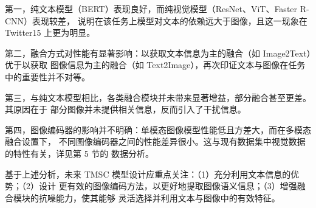 \documentclass[12pt]{ctexart}
\begin{document}
第一，纯文本模型（BERT）表现良好，而纯视觉模型（ResNet、ViT、Faster R-CNN）表现较差，
说明在该任务上模型对文本的依赖远大于图像，且这一现象在 Twitter15 上更为明显。

第二，融合方式对性能有显著影响：以获取文本信息为主的融合（如 Image2Text）优于以获取
图像信息为主的融合（如 Text2Image），再次印证文本与图像在任务中的重要性并不对等。

第三，与纯文本模型相比，各类融合模块并未带来显著增益，部分融合甚至更差。其原因在于
部分图像并未提供相关信息，反而引入了干扰信息。

第四，图像编码器的影响并不明确：单模态图像模型性能低且方差大，而在多模态融合设置下，
不同图像编码器之间的性能差异很小。这与现有数据集中视觉数据的特性有关，详见第 5 节的
数据分析。

基于上述分析，未来 TMSC 模型设计应重点关注：（1）充分利用文本信息的优势；（2）设计
更有效的图像编码方法，以更好地提取图像语义信息；（3）增强融合模块的抗噪能力，使其能够
灵活选择并利用文本与图像中的有效特征\cite{ye2023}。
\end{document}
